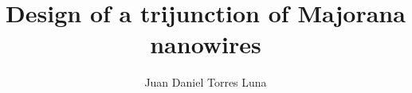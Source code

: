 \documentclass[whitelogo]{tudelft-report}
\begin{document}


\title[tudelft-black]{Design of a trijunction of Majorana nanowires}
\author[tudelft-black]{Juan Daniel Torres Luna}

\makecover[split]




%

\tableofcontents

\mainmatter








\end{document}
